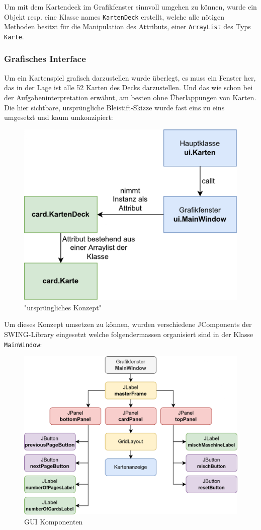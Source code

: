 \documentclass[a4paper,11pt]{article}
\begin{document}
Um mit dem Kartendeck im Grafikfenster sinnvoll umgehen zu können, wurde ein Objekt resp. eine Klasse names \texttt{KartenDeck} erstellt, welche alle nötigen Methoden besitzt für die Manipulation des Attributs, einer \texttt{ArrayList} des Typs \texttt{Karte}.

\subsubsection{Grafisches Interface}

Um ein Kartenspiel grafisch darzustellen wurde überlegt, es muss ein Fenster her, das in der Lage ist alle 52 Karten des Decks darzustellen. Und das wie schon bei der Aufgabeninterpretation erwähnt, am besten ohne Überlappungen von Karten. Die hier sichtbare, ursprüngliche Bleistift-Skizze wurde fast eins zu eins umgesetzt und kaum umkonzipiert:

\begin{figure}[H]
    \centering
    \includegraphics[width=.4\textwidth]{media/grober-ansatz.png}
    \caption{"ursprüngliches Konzept"}
\end{figure}

Um dieses Konzept umsetzen zu können, wurden verschiedene JComponents der SWING-Library eingesetzt welche folgendermassen organisiert sind in der Klasse \texttt{MainWindow}:

\begin{figure}[H]
    \centering
    \includegraphics[width=.7\textwidth]{media/gui-overview.png}
    \caption{GUI Komponenten}
\end{figure}
\end{document}
